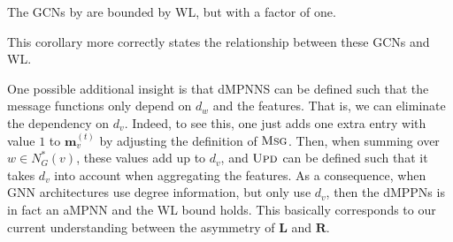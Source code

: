 \begin{corollary}
	The GCNs by \citet{KipfW16} are bounded by WL, but with a factor of one.
\end{corollary}
This corollary more correctly states the relationship between these GCNs and WL.




\smallskip
\noindent
\leftpointright
One possible additional insight is that dMPNNS can be defined such that
the message functions  only depend on $d_w$ and the features. That is, we 
can eliminate the dependency on $d_v$.
Indeed, to see this, one just adds one extra entry with value $1$ to $\mathbf{m}_v^{(t)}$ by adjusting the definition of $\textsc{Msg}$. Then, when summing over
$w\in N_G^*(v)$, these values add up to $d_v$, and $\textsc{Upd}$ can be defined such that it takes $d_v$ into account when aggregating the features. 
As a consequence, when GNN architectures use degree information, but only use $d_v$, then the dMPPNs is in fact an aMPNN and the WL bound holds. This basically corresponds to our current understanding between the asymmetry of $\mathbf{L}$ and $\mathbf{R}$. 











